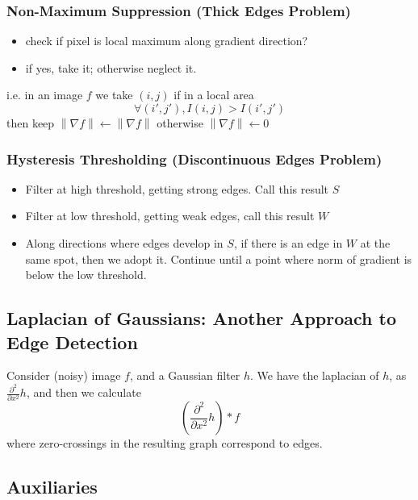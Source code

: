 \documentclass[11pt]{article}
\newcommand{\norm}[1]{\left\lVert#1\right\rVert}
\begin{document}
\subsubsection{Non-Maximum Suppression (Thick Edges Problem)}
\begin{itemize}
	\item check if pixel is local maximum along gradient direction?
	\item if yes, take it; otherwise neglect it. 
\end{itemize}
i.e. in an image $f$ we take $(i, j)$ if in a local area 
\begin{equation}
	\forall (i', j'), I(i, j) > I (i',j')
\end{equation}
then keep $\norm{\nabla f} \gets \norm{\nabla f}$ otherwise $\norm{\nabla f} \gets 0$

\subsubsection{Hysteresis Thresholding (Discontinuous Edges Problem)}
\begin{itemize}
	\item Filter at high threshold, getting strong edges. Call this result $S$
	\item Filter at low threshold, getting weak edges, call this result $W$
	\item Along directions where edges develop in $S$, if there is an edge in $W$ at the same spot, then we adopt it. Continue until a point where norm of gradient is below the low threshold. 
\end{itemize}


\subsection{Laplacian of Gaussians: Another Approach to Edge Detection}
Consider (noisy) image $f$, and a Gaussian filter $h$. We have the laplacian of $h$, as $\frac{\partial^{2}}{\partial x^{2}} h$, and then we calculate 
\begin{equation}
	\left(\frac{\partial^{2}}{\partial x^{2}} h\right) \ast f
\end{equation}
where zero-crossings in the resulting graph correspond to edges. 

\subsection{Auxiliaries} 
\end{document}
